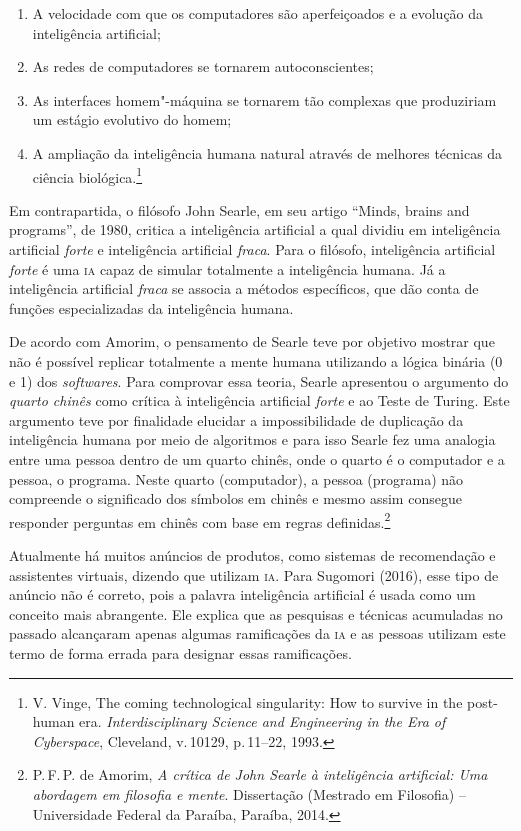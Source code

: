 \begin{enumerate}
\item A velocidade com que os computadores são aperfeiçoados e a evolução da inteligência artificial;

\item As redes de computadores se tornarem autoconscientes;

\item As interfaces homem"-máquina se tornarem tão complexas que produziriam um estágio evolutivo do homem;

\item A ampliação da inteligência humana natural através de melhores
técnicas da ciência biológica.\footnote{V. Vinge, The coming technological singularity: How to survive in the post-human era. \textit{Interdisciplinary Science and
Engineering in the Era of Cyberspace}, Cleveland, v.\,10129, p.\,11--22,
1993.}
\end{enumerate}

Em contrapartida, o filósofo John Searle, em seu artigo ``Minds,
brains and programs'', de 1980, critica a inteligência artificial a qual dividiu em inteligência artificial \textit{forte} e
inteligência artificial \textit{fraca}. Para o filósofo, inteligência artificial \textit{forte} é uma \textsc{ia} capaz de simular totalmente a inteligência humana. Já a
inteligência artificial \textit{fraca} se associa a métodos específicos, que dão
conta de funções especializadas da inteligência humana.

De acordo com Amorim, o pensamento de Searle teve por objetivo
mostrar que não é possível replicar totalmente a mente humana utilizando
a lógica binária (0 e 1) dos \textit{softwares}. Para
comprovar essa teoria, Searle apresentou o argumento do \textit{quarto
chinês} como crítica à inteligência artificial \textit{forte} e ao Teste de
Turing. Este argumento teve por finalidade elucidar a impossibilidade de
duplicação da inteligência humana por meio de algoritmos e para isso
Searle fez uma analogia entre uma pessoa dentro de um quarto chinês,
onde o quarto é o computador e a pessoa, o programa. Neste quarto
(computador), a pessoa (programa) não compreende o significado dos
símbolos em chinês e mesmo assim consegue responder perguntas em chinês
com base em regras definidas.\footnote{P.\,F.\,P. de Amorim, \textit{A crítica de John Searle à inteligência artificial: Uma abordagem em filosofia e mente}. Dissertação (Mestrado em Filosofia) -- Universidade Federal da Paraíba, Paraíba, 2014.}

Atualmente há muitos anúncios de produtos, como sistemas de recomendação
e assistentes virtuais, dizendo que utilizam \textsc{ia}. Para Sugomori (2016),
esse tipo de anúncio não é correto, pois a palavra inteligência
artificial é usada como um conceito mais abrangente. Ele explica que as
pesquisas e técnicas acumuladas no passado alcançaram apenas algumas
ramificações da \textsc{ia} e as pessoas utilizam este termo de forma errada para
designar essas ramificações.

